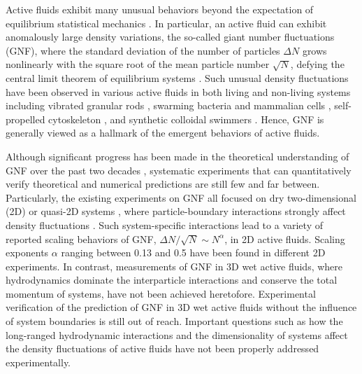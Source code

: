 \documentclass[twocolumn,aps,prx,amsmath,amssymb,longbibliography,superscriptaddress]{revtex4-2}
\begin{document}
Active fluids exhibit many unusual behaviors beyond the expectation of equilibrium statistical mechanics \cite{Ramaswamy2010,Cates2012,Marchetti2013,Poon2013,Elgeti2015}.
In particular, an active fluid can exhibit anomalously large density variations, the so-called giant number fluctuations (GNF), where the standard deviation of the number of particles $\Delta N$ grows nonlinearly with the square root of the mean particle number $\sqrt N$, defying the central limit theorem of equilibrium systems \cite{Mishin2015}.
Such unusual density fluctuations have been observed in various active fluids in both living and non-living systems including vibrated granular rods \cite{Narayan2007,Aranson2008,Kudrolli2008,Deseigne2010}, swarming bacteria \cite{Zhang2010,Nishiguchi2017} and mammalian cells \cite{Kawaguchi2017},
self-propelled cytoskeleton \cite{Schaller2013}, and synthetic colloidal swimmers \cite{Palacci2013,Karani2019}. Hence, GNF is generally viewed as a hallmark of the emergent behaviors of active fluids.


Although significant progress has been made in the theoretical understanding of GNF over the past two decades \cite{Toner1995, Tu1998, Toner1998, AditiSimha2002, Ramaswamy2003, Toner2005, Chate2008, Mishra2010, Dey2012, Saintillan2012, Saintillan2013, Ngo2014,  Mahault2019}, systematic experiments that can quantitatively verify theoretical and numerical predictions are still few and far between. Particularly, the existing experiments on GNF all focused on dry two-dimensional (2D) or quasi-2D systems \cite{Narayan2007, Aranson2008, Kudrolli2008, Deseigne2010, Zhang2010, Schaller2013, Nishiguchi2017, Kawaguchi2017, Palacci2013}, where particle-boundary interactions strongly affect density fluctuations \cite{Marchetti2013}.
Such system-specific interactions lead to a variety of reported scaling behaviors of GNF, $\Delta N/\sqrt N \sim N^\alpha$, in 2D active fluids.
Scaling exponents $\alpha$ ranging between 0.13 and 0.5 have been found in different 2D experiments. In contrast, measurements of GNF in 3D wet active fluids, where hydrodynamics dominate the interparticle interactions and conserve the total momentum of systems, have not been achieved heretofore. Experimental verification of the prediction of GNF in 3D wet active fluids without the influence of system boundaries is still out of reach. Important questions such as how the long-ranged hydrodynamic interactions and the dimensionality of systems affect the density fluctuations of active fluids have not been properly addressed experimentally.
\end{document}

